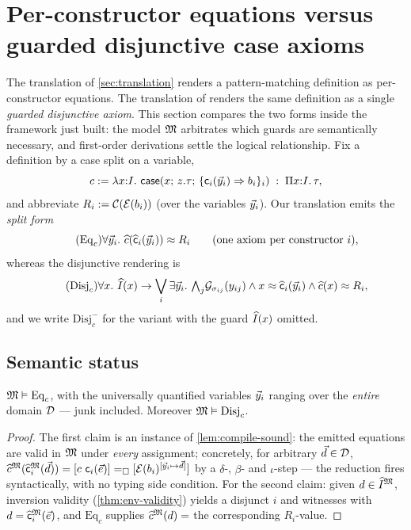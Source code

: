 \section{Per-constructor equations versus guarded disjunctive case axioms}
\label{sec:casesplit}

The translation of \cref{sec:translation} renders a pattern-matching
definition as per-constructor equations.  The translation of
\cite[\S 5.2]{CzajkaKaliszyk2018} renders the same definition as a single
\emph{guarded disjunctive axiom}.  This section compares the two forms
inside the framework just built: the model $\mathfrak{M}$ arbitrates which guards
are semantically necessary, and first-order derivations settle the
logical relationship.  Fix a definition by a case split on a variable,
\[
  c \defeq \lambda x{:}I.\ \tcase{x}{z.\tau}{\{\wcns{c}_i(\tup{y}_i)
  \Rightarrow b_i\}_i} \;:\; \Pi x{:}I.\,\tau ,
\]
and abbreviate $R_i \mathrel{:=} \mathcal{C}(\mathcal{E}(b_i))$ (over the variables
$\vec{y}_i$).  Our translation emits the \emph{split form}
\begin{equation}
  \tag{$\mathrm{Eq}_c$}
  \forall \tup{y}_i.\ \Ihat{c}(\Ihat{\wcns{c}}_i(\tup{y}_i)) \feq R_i
  \qquad \text{(one axiom per constructor $i$),}
\end{equation}
whereas the disjunctive rendering is
\begin{equation}
  \tag{$\mathrm{Disj}_c$}
  \forall x.\ \Ihat{I}(x) \to \bigvee_i \exists \tup{y}_i.\
    {\textstyle\bigwedge_j} \guard{\sigma_{ij}}{y_{ij}} \wedge
    x \feq \Ihat{\wcns{c}}_i(\tup{y}_i) \wedge \Ihat{c}(x) \feq R_i ,
\end{equation}
and we write $\mathrm{Disj}^-_c$ for the variant with the guard
$\widehat{I}(x)$ omitted.

\subsection{Semantic status}
\label{sec:casesplit-semantic}

\begin{proposition}
\label{prop:split-valid}
$\mathfrak{M} \vDash \mathrm{Eq}_c$, with the universally quantified variables
$\vec{y}_i$ ranging over the \emph{entire} domain $\mathcal{D}$ --- junk
included.  Moreover $\mathfrak{M} \vDash \mathrm{Disj}_c$.
\end{proposition}

\begin{proof}
The first claim is an instance of \cref{lem:compile-sound}: the emitted
equations are valid in $\mathfrak{M}$ under \emph{every} assignment; concretely,
for arbitrary $\vec{d} \in \mathcal{D}$,
$\widehat{c}^{\mathfrak{M}}(\widehat{\mathsf{c}}_i^{\mathfrak{M}}(\vec{d})) =
[c\ \mathsf{c}_i(\vec{e})] =_{\square} [\mathcal{E}(b_i)^{[\vec{y}_i \mapsto
\vec{d}]}]$ by a $\delta$-, $\beta$- and $\iota$-step --- the reduction
fires syntactically, with no typing side condition.  For the second
claim: given $d \in \widehat{I}^{\mathfrak{M}}$, inversion validity
(\cref{thm:env-validity}) yields a disjunct $i$ and witnesses with $d =
\widehat{\mathsf{c}}_i^{\mathfrak{M}}(\vec{e})$, and $\mathrm{Eq}_c$ supplies
$\widehat{c}^{\mathfrak{M}}(d) = $ the corresponding $R_i$-value.
\end{proof}

